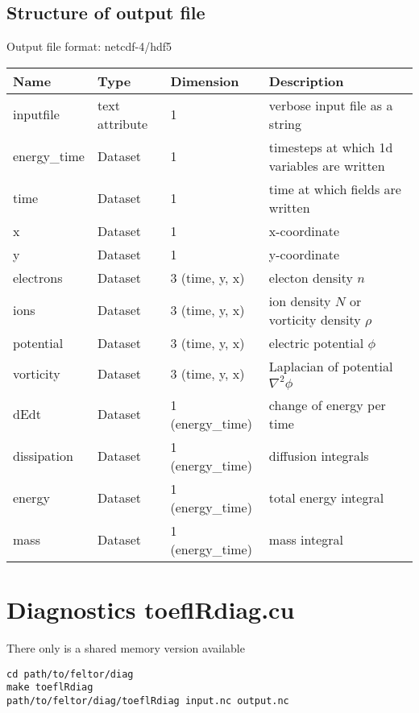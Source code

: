 \subsection{Structure of output file}
Output file format: netcdf-4/hdf5
%
\begin{longtable}{lll>{\RaggedRight}p{7cm}}
\toprule
\rowcolor{gray!50}\textbf{Name} &  \textbf{Type} & \textbf{Dimension} & \textbf{Description}  \\ \midrule
inputfile  &             text attribute & 1 & verbose input file as a string \\
energy\_time             & Dataset & 1 & timesteps at which 1d variables are written \\
time                     & Dataset & 1 & time at which fields are written \\
x                        & Dataset & 1 & x-coordinate  \\
y                        & Dataset & 1 & y-coordinate \\
electrons                & Dataset & 3 (time, y, x) & electon density $n$ \\
ions                     & Dataset & 3 (time, y, x) & ion density $N$ or vorticity density $\rho$  \\
potential                & Dataset & 3 (time, y, x) & electric potential $\phi$  \\
vorticity                & Dataset & 3 (time, y, x) & Laplacian of potential $\nabla^2\phi$  \\
dEdt                     & Dataset & 1 (energy\_time) & change of energy per time  \\
dissipation              & Dataset & 1 (energy\_time) & diffusion integrals  \\
energy                   & Dataset & 1 (energy\_time) & total energy integral  \\
mass                     & Dataset & 1 (energy\_time) & mass integral   \\
\bottomrule
\end{longtable}
\section{Diagnostics toeflRdiag.cu}
There only is a shared memory version available
\begin{verbatim}
cd path/to/feltor/diag
make toeflRdiag
path/to/feltor/diag/toeflRdiag input.nc output.nc
\end{verbatim}

